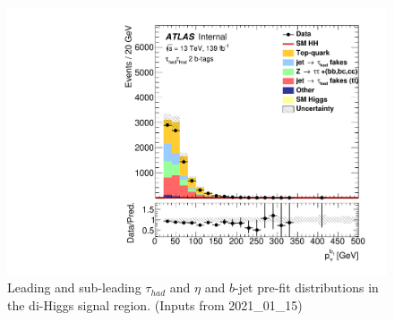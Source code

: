 \begin{figure}
\includegraphics[width=.45\textwidth]{figures/selection/HadHad_HH/Region_BMin0_incJet1_distJet1Pt_J2_Y2015_DLLOS_T2_SpcTauHH_L0_Prefit.pdf}
\caption{Leading and sub-leading $\tau_{had}$ \pt and $\eta$ and $b$-jet \pt pre-fit
  distributions in the di-Higgs \hadhad signal region. (Inputs from 2021\_01\_15)}
\label{fig:HadHadPreselectionPtDistributions}
\end{figure}

